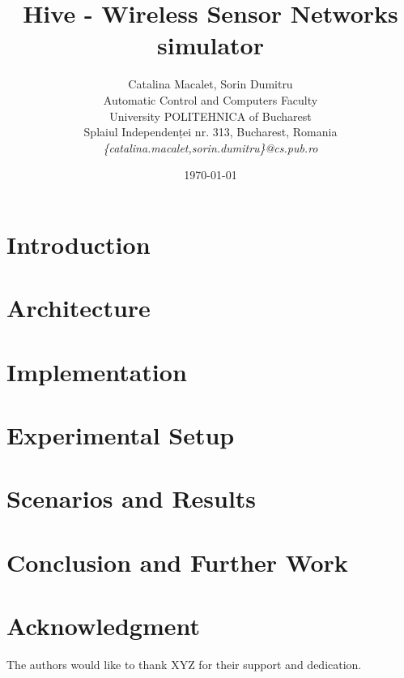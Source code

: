 \documentclass[12pt]{article}
\title{Hive - Wireless Sensor Networks simulator}
\author{Catalina Macalet, Sorin Dumitru\\
Automatic Control and Computers Faculty\\
University POLITEHNICA of Bucharest\\
Splaiul Independenței nr. 313, Bucharest, Romania \\
\emph{\{catalina.macalet,sorin.dumitru\}@cs.pub.ro}}
\date{\today}
\begin{document}
\maketitle

\begin{abstract}

\end{abstract}

\section{Introduction}
\label{sec:introduction}


\section{Architecture}
\label{sec:architecture}


\section{Implementation}
\label{sec:implementation}


\section{Experimental Setup}
\label{sec:setup}


\section{Scenarios and Results}
\label{sec:results}


\section{Conclusion and Further Work}
\label{sec:conclusion}


\section*{Acknowledgment}
\label{sec:acknowledgment}

The authors would like to thank XYZ for their support and dedication.



\end{document}
